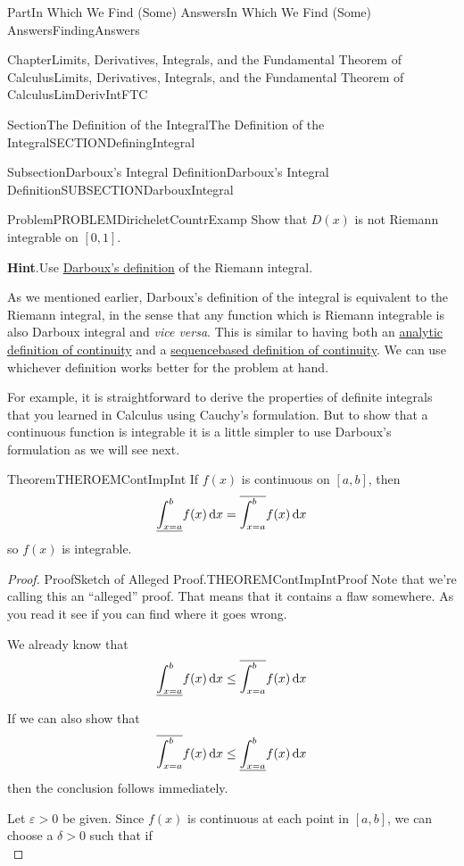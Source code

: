\documentclass[oneside,10pt,]{book}
\newcommand{\blocktitlefont}{\relax}
\numberwithin{equation}{part}
\newcommand{\dx}[1]{\,{\rm d}#1}
\newcommand{\eps}{\varepsilon}
\newcommand{\gt}{>}
\begin{document}
\begin{partptx}{Part}{In Which We Find (Some) Answers}{}{In Which We Find (Some) Answers}{}{}{FindingAnswers}
\begin{chapterptx}{Chapter}{Limits, Derivatives, Integrals, and the Fundamental Theorem of Calculus}{}{Limits, Derivatives, Integrals, and the Fundamental Theorem of Calculus}{}{}{LimDerivIntFTC}
\begin{sectionptx}{Section}{The Definition of the Integral}{}{The Definition of the Integral}{}{}{SECTIONDefiningIntegral}
\begin{subsectionptx}{Subsection}{Darboux's Integral Definition}{}{Darboux's Integral Definition}{}{}{SUBSECTIONDarbouxIntegral}
\begin{problem}{Problem}{}{PROBLEMDiricheletCountrExamp}
Show that \(D(x)\) is not Riemann integrable on \([0,1]\).%
\par\smallskip%
\noindent\textbf{\blocktitlefont Hint}.\hypertarget{PROBLEMDiricheletCountrExamp-2}{}\quad{}Use \hyperref[DEFINITIONDarbouxIntegral]{Darboux's definition} of the Riemann integral.%
\end{problem}
As we mentioned earlier, Darboux's definition of the integral is equivalent to the Riemann integral, in the sense that any function which is Riemann integrable is also Darboux integral and \textit{vice versa}. This is similar to having both an \hyperref[def_continuity]{analytic definition of continuity} and a \hyperref[thm_LimDefOfContinuity]{sequence\textendash{}based definition of continuity}. We can use whichever definition works better for the problem at hand.%
\par
For example, it is straightforward to derive the properties of definite integrals that you learned in Calculus using Cauchy's formulation.  But to show that a continuous function is integrable it is a little simpler to use Darboux's formulation as we will see next.%
\begin{theorem}{Theorem}{}{}{THEROEMContImpInt}%
If \(f\left(x\right)\) is continuous on \([a,b]\), then%
\begin{equation*}
\underline{\int^b_{x=a}}{f(x)}\dx{x}=\overline{\int^{b}_{x=a}}{f(x)\dx{x}}
\end{equation*}
so \(f(x)\) is integrable.%
\end{theorem}
\begin{proof}{Proof}{Sketch of Alleged Proof.}{THEOREMContImpIntProof}
Note that we're calling this an ``alleged'' proof. That means that it contains a flaw somewhere. As you read it see if you can find where it goes wrong.%
\par
We already know that%
\begin{equation*}
\underline{\int^b_{x=a}}{f(x)}\dx{x}\le
\overline{\int^{b}_{x=a}}{f(x)\dx{x}}
\end{equation*}
%
\par
If we can also show that%
\begin{equation*}
\overline{\int^{b}_{x=a}}{f(x)\dx{x}}\le
\underline{\int^b_{x=a}}{f(x)}\dx{x}
\end{equation*}
then the conclusion follows immediately.%
\par
Let \(\eps \gt 0\) be given.  Since \(f\left(x\right)\) is continuous at each point in \([a,b]\), we can choose a \(\delta >0\) such that if%
\begin{equation}

\end{equation}
\end{proof}
\end{subsectionptx}
\end{sectionptx}
\end{chapterptx}
\end{partptx}
\end{document}
